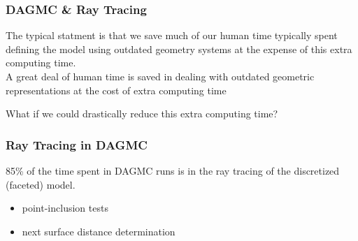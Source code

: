 \documentclass[12pt]{beamer}
\begin{document}

  









\begin{frame}

  \frametitle{DAGMC \& Ray Tracing}
  
  The typical statment is that we save much of our human time typically spent defining the model using outdated geometry systems at the expense of this extra computing time. \\

  A great deal of human time is saved in dealing with outdated geometric representations at the cost of extra computing time
 \vfill
 
 What if we could drastically reduce this extra computing time?

 \vfill

  
\end{frame}

\begin{frame}

\frametitle{Ray Tracing in DAGMC}
\vfill
 85\% of the time spent in DAGMC runs is in the ray tracing of the discretized (faceted) model.
\vfill 
\begin{itemize}
\item point-inclusion tests
\item next surface distance determination
\end{itemize}



\end{frame}
\end{document}
